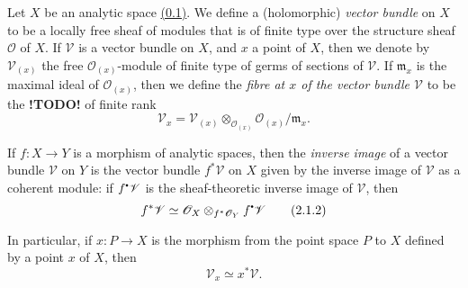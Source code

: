 \documentclass{report}
\theoremstyle{plain}
\theoremstyle{definition}
\newenvironment{env}[1]
    {\renewcommand\theinnercustomenv{#1}\innercustomenv}
    {\endinnercustomenv}
\newcommand{\sh}{\mathscr}
\newcommand{\sbullet}{{\mathbin{\vcenter{\hbox{\scalebox{.5}{$\bullet$}}}}}}
\newcommand{\todo}{\textbf{ !TODO! }}
\begin{document}
\begin{env}{2.1}
  Let $X$ be an analytic space \hyperref[0.1]{(0.1)}.
  We define a (holomorphic) \emph{vector bundle} on $X$ to be a locally free sheaf of modules that is of finite type over the structure sheaf $\sh{O}$ of $X$.
  If $\sh{V}$ is a vector bundle on $X$, and $x$ a point of $X$, then we denote by $\sh{V}_{(x)}$ the free $\sh{O}_{(x)}$-module of finite type of germs of sections of $\sh{V}$.
  If $\mathfrak{m}_x$ is the maximal ideal of $\sh{O}_{(x)}$, then we define the \emph{fibre at $x$ of the vector bundle $\sh{V}$} to be the \todo of finite rank
  \[
  \label{I.2.1.1}
    \sh{V}_x = \sh{V}_{(x)} \otimes_{\sh{O}_{(x)}} \sh{O}_{(x)}/\mathfrak{m}_x.
  \tag{2.1.1}
  \]

  If $f\colon X\to Y$ is a morphism of analytic spaces, then the \emph{inverse image} of a vector bundle $\sh{V}$ on $Y$ is the vector bundle $f^*\sh{V}$ on $X$ given by the inverse image of $\sh{V}$ as a coherent module:
  if $f^\sbullet\sh{V}$ is the sheaf-theoretic inverse image of $\sh{V}$, then
  \[
  \label{I.2.1.2}
    f^*\sh{V} \simeq \sh{O}_X \otimes_{f^*\sh{O}_Y} f^\sbullet\sh{V}
  \tag{2.1.2}
  \]

  In particular, if $x\colon P\to X$ is the morphism from the point space $P$ to $X$ defined by a point $x$ of $X$, then
  \[
    \label{I.2.1.3}
      \sh{V}_x \simeq x^*\sh{V}.
    \tag{2.1.3}
  \]
\end{env}
\end{document}
